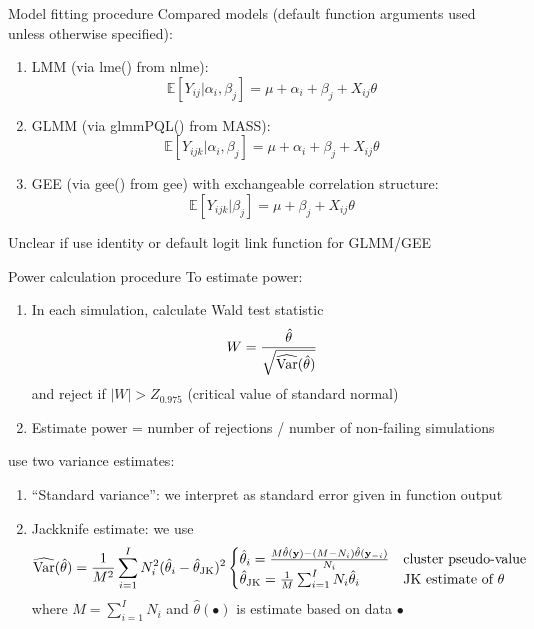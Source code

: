 \documentclass[9pt]{beamer}
\begin{document}
\begin{frame}{Model fitting procedure}
Compared models (default function arguments used unless otherwise specified):
\vspace{1em}
\begin{enumerate}
\setlength\itemsep{1em}

\item
LMM (via lme() from nlme):
\[
\mathbb{E}[Y_{ij}|\alpha_i,\beta_j] = \mu+\alpha_i+\beta_j+X_{ij}\theta
\]

\item
GLMM (via glmmPQL() from MASS):
\[
\mathbb{E}[Y_{ijk}|\alpha_i,\beta_j] = \mu+\alpha_i+\beta_j+X_{ij}\theta
\]

\item
GEE (via gee() from gee) with exchangeable correlation structure:
\[
\mathbb{E}[Y_{ijk}|\beta_j] = \mu+\beta_j+X_{ij}\theta
\]

\end{enumerate}
\vspace{2em}

Unclear if \citeauthor{Hussey:2007} use identity or default logit link function for GLMM/GEE
\end{frame}



\begin{frame}{Power calculation procedure}
To estimate power:
\begin{enumerate}

\item
In each simulation, calculate Wald test statistic
\[
W=\frac{\hat{\theta}}{\sqrt{\widehat{\mathrm{Var}}(\hat{\theta})}}
\]
and reject if $|W| > Z_{0.975}$ (critical value of standard normal)

\item
Estimate power = number of rejections / number of non-failing simulations

\end{enumerate}
\vspace{2em}

\citet{Hussey:2007} use two variance estimates:
\begin{enumerate}

\item
``Standard variance'': we interpret as standard error given in function output

\item
Jackknife estimate: we use
\[
\widehat{\mathrm{Var}}(\hat{\theta}) = \frac{1}{M^2}\sum_{i=1}^IN_i^2(\hat{\theta}_i-\hat{\theta}_{\text{JK}})^2
\begin{cases}
\hat{\theta}_i = \frac{M\hat{\theta}(\mathbf{y}) - (M-N_i)\hat{\theta}(\mathbf{y}_{-i})}{N_i} & \text{cluster pseudo-value} \\
\hat{\theta}_{\text{JK}} = \frac{1}{M}\sum_{i=1}^I N_i\hat{\theta}_i & \text{JK estimate of $\theta$}
\end{cases}
\]
where $M=\sum_{i=1}^I N_i$ and $\hat{\theta}(\bullet)$ is estimate based on data $\bullet$
\end{enumerate}
\end{frame}
\end{document}
